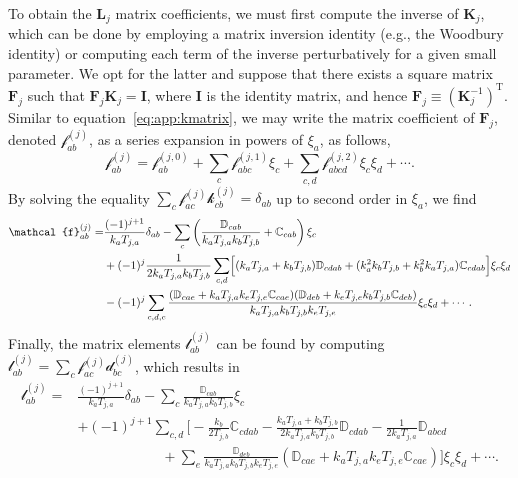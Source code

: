 \documentclass[a4paper]{jpconf}
\newcommand{\pow}[2]{#1^{(#2)}}
\begin{document}
To obtain the $\mathbf{L}_j$ matrix coefficients, we must first compute the inverse of $\mathbf{K}_j$, which can be done by employing a matrix inversion identity (e.g., the Woodbury identity) or computing each term of the inverse perturbatively for a given small parameter. We opt for the latter and suppose that there exists a square matrix $\mathbf{F}_j$ such that $\mathbf{F}_j\mathbf{K}_j=\mathbf{I}$, where $\mathbf{I}$ is the identity matrix, and hence $\mathbf{F}_j\equiv(\mathbf{K}_j^{-1})^\mathrm{T}$. Similar to equation~\eqref{eq:app:kmatrix}, we may write the matrix coefficient of $\mathbf{F}_j$, denoted $\pow{\mathcal{f}}{j}_{ab}$, as a series expansion in powers of $\xi_a$, as follows,
\begin{equation}
    \pow{\mathcal{f}}{j}_{ab}= \pow{\mathcal{f}}{j,0}_{ab}
    +\sum_{c}\pow{\mathcal{f}}{j,1}_{abc}\xi_c
    +\sum_{c,d}\pow{\mathcal{f}}{j,2}_{abcd}\xi_c\xi_d+\cdots.
\end{equation}
By solving the equality $\sum_c\pow{\mathcal{f}}{j}_{ac}\pow{\mathcal{k}}{j}_{cb}=\delta_{ab}$ up to second order in $\xi_a$, we find
\begin{equation}
\begin{aligned}
\label{eq:app:fmatrix}
    \pow{\mathcal{f}}{j}_{ab}=
    &\frac{(-1)^{j+1}}{k_a T_{j,a}} \delta_{ab} 
    -\sum_c\left(\frac{\mathbb{D}_{cab}}{k_aT_{j,a} k_b T_{j,b}}+ \mathbb{C}_{cab}\right)\xi_c\\
    &+(-1)^{j}\frac{1}{2k_aT_{j,a}k_bT_{j,b}}\sum_{c,d} \Bigl[(k_aT_{j,a}+k_bT_{j,b})\mathbb{D}_{cdab}+(k_a^2k_bT_{j,b}+k_b^2k_aT_{j,a})\mathbb{C}_{cdab}\Bigl]\xi_c\xi_d\\
    &-(-1)^{j}\sum_{c,d,e}\frac{(\mathbb{D}_{cae}+k_aT_{j,a} k_e T_{j,e} \mathbb{C}_{cae})(\mathbb{D}_{deb}+k_eT_{j,e} k_b T_{j,b} \mathbb{C}_{deb})}{k_aT_{j,a}k_bT_{j,b}k_eT_{j,e}}\xi_c\xi_d
    +\cdots.
\end{aligned}
\end{equation}
Finally, the matrix elements $\pow{\mathcal{l}}{j}_{ab}$ can be found by computing $\pow{\mathcal{l}}{j}_{ab}=\sum_c \pow{\mathcal{f}}{j}_{ac}\pow{\mathcal{d}}{j}_{bc}$, which results in
\begin{equation}
\begin{aligned}
\label{eq:app:lmatrix}
    \pow{\mathcal{l}}{j}_{ab}=
    &\frac{(-1)^{j+1}}{k_a T_{j,a}} \delta_{ab} 
    -\sum_c\frac{\mathbb{D}_{cab}}{k_aT_{j,a} k_b T_{j,b}}\xi_c\\
    &+(-1)^{j+1}\sum_{c,d}\biggl[-\frac{k_b}{2T_{j,b}}\mathbb{C}_{cdab}-\frac{k_aT_{j,a}+k_bT_{j,b}}{2k_aT_{j,a}k_bT_{j,b}}\mathbb{D}_{cdab}-\frac{1}{2k_a T_{j,a}}\mathbb{D}_{abcd}\\
    &\qquad\qquad\qquad+\sum_{e}\frac{\mathbb{D}_{deb}}{k_aT_{j,a}k_bT_{j,b}k_eT_{j,e}}(\mathbb{D}_{cae}+k_aT_{j,a} k_e T_{j,e} \mathbb{C}_{cae})\biggl]\xi_c\xi_d
    +\cdots.
\end{aligned}
\end{equation}
\end{document}
